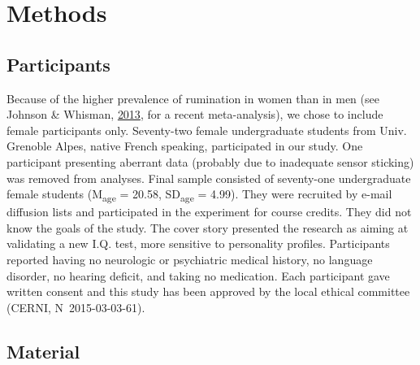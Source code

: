 \documentclass[a4paper,12pt,twoside,openright,oldfontcommands,final]{memoir}
\begin{document}
\hypertarget{methods}{%
\section{Methods}\label{methods}}

\hypertarget{participants}{%
\subsection{Participants}\label{participants}}

Because of the higher prevalence of rumination in women than in men (see Johnson \& Whisman, \protect\hyperlink{ref-Johnson2013}{2013}, for a recent meta-analysis), we chose to include female participants only. Seventy-two female undergraduate students from Univ. Grenoble Alpes, native French speaking, participated in our study. One participant presenting aberrant data (probably due to inadequate sensor sticking) was removed from analyses. Final sample consisted of seventy-one undergraduate female students (M\textsubscript{age} = 20.58, SD\textsubscript{age} = 4.99). They were recruited by e-mail diffusion lists and participated in the experiment for course credits. They did not know the goals of the study. The cover story presented the research as aiming at validating a new I.Q. test, more sensitive to personality profiles. Participants reported having no neurologic or psychiatric medical history, no language disorder, no hearing deficit, and taking no medication. Each participant gave written consent and this study has been approved by the local ethical committee (CERNI, N\textdegree ~2015-03-03-61).

\hypertarget{material}{%
\subsection{Material}\label{material}}
\end{document}
